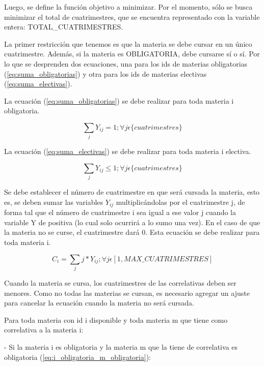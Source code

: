 \documentclass[a4paper]{article}
\begin{document}
Luego, se define la función objetivo a minimizar. Por el momento, sólo se busca minimizar el total de cuatrimestres, que se encuentra representado con la variable entera: TOTAL\_CUATRIMESTRES.

La primer restricción que tenemos es que la materia se debe cursar en un único cuatrimestre. Además, si la materia es OBLIGATORIA, debe cursarse sí o sí. Por lo que se desprenden dos ecuaciones, una para los ids de materias obligatorias (\ref{eq:suma_obligatorias}) y otra para los ids de materias electivas (\ref{eq:suma_electivas}).

La ecuación (\ref{eq:suma_obligatorias}) se debe realizar para toda materia i obligatoria.

\begin{equation}\label{eq:suma_obligatorias}
\sum_{j} Y_{ij} = 1 ; \forall j \epsilon \{cuatrimestres\}
\end{equation}

La ecuación (\ref{eq:suma_electivas}) se debe realizar para toda materia i electiva.

\begin{equation}\label{eq:suma_electivas}
\sum_{j} Y_{ij} \leq 1 ; \forall j \epsilon \{cuatrimestres\}
\end{equation}

Se debe establecer el número de cuatrimestre en que será cursada la materia, esto es, se deben sumar las variables $Y_{ij}$ multiplicándolas por el cuatrimestre j, de forma tal que el número de cuatrimestre i sea igual a ese valor j cuando la variable Y de positiva (lo cual solo ocurrirá a lo sumo una vez). En el caso de que la materia no se curse, el cuatrimestre dará 0.
Esta ecuación se debe realizar para toda materia i.

\begin{equation}\label{eq:numero_cuatrimestre_materias}
C_{i} = \sum_{j} j * Y_{ij} ; \forall j \epsilon [1, MAX\_CUATRIMESTRES]
\end{equation}

Cuando la materia se cursa, los cuatrimestres de las correlativas deben ser menores. Como no todas las materias se cursan, es necesario agregar un ajuste para cancelar la ecuación cuando la materia no será cursada.

Para toda materia con id i disponible y toda materia m que tiene como correlativa a la materia i:

- Si la materia i es obligatoria y la materia m que la tiene de correlativa es obligatoria (\ref{eq:i_obligatoria_m_obligatoria}):
\end{document}
